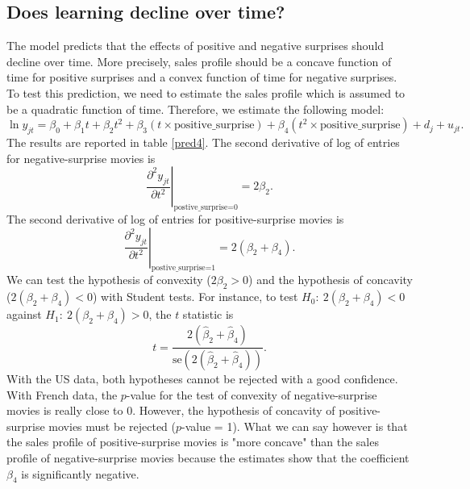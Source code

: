 \subsection{Does learning decline over time?}\label{subsec2.5}

The model predicts that the effects of positive and negative surprises should decline over time.
More precisely, sales profile should be a concave function of time for positive surprises and a convex function of time for negative surprises.
To test this prediction, we need to estimate the sales profile which is assumed to be a quadratic function of time.
Therefore, we estimate the following model:
\begin{equation*}
	\ln y_{jt} = \beta_0 + \beta_1 t + \beta_2 t^2 + \beta_3 (t \times \text{positive\_surprise}) + \beta_4 (t^2 \times \text{positive\_surprise}) + d_j + u_{jt}.
\end{equation*}
The results are reported in table \ref{pred4}.
The second derivative of log of entries for negative-surprise movies is 
\begin{equation*}
	\left.\frac{\partial^2 y_{jt}}{\partial t^2}\right|_{\text{postive\_surprise=0}} = 2 \beta_2.
\end{equation*}
The second derivative of log of entries for positive-surprise movies is 
\begin{equation*}
	\left.\frac{\partial^2 y_{jt}}{\partial t^2}\right|_{\text{postive\_surprise=1}} = 2 (\beta_2 + \beta_4).
\end{equation*}
We can test the hypothesis of convexity ($2\beta_2 > 0$) and the hypothesis of concavity ($2(\beta_2 + \beta_4) < 0$) with Student tests.
For instance, to test $H_0:~2(\beta_2 + \beta_4) < 0$ against $H_1:~2(\beta_2 + \beta_4) > 0$, the $t$ statistic is
\begin{equation*}
	t = \frac{2(\hat{\beta}_2 + \hat{\beta}_4)}{\text{se}(2(\hat{\beta}_2 + \hat{\beta}_4))} .
\end{equation*}
With the US data, both hypotheses cannot be rejected with a good confidence.
With French data, the $p$-value for the test of convexity of negative-surprise movies is really close to 0. 
However, the hypothesis of concavity of positive-surprise movies must be rejected ($p$-value = 1).
What we can say however is that the sales profile of positive-surprise movies is "more concave" than the sales profile of negative-surprise movies because the estimates show that the coefficient $\beta_4$ is significantly negative.

